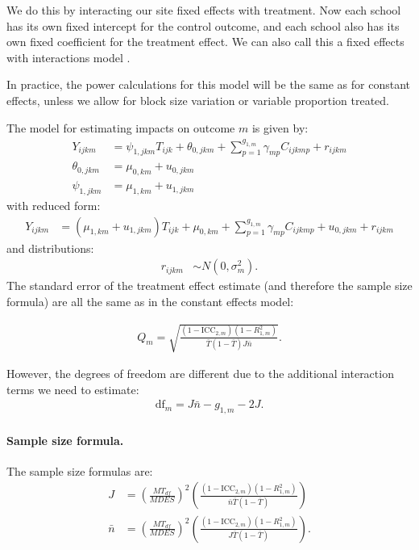 \documentclass[12pt]{article}
\begin{document}
We do this by interacting our site fixed effects with treatment.
Now each school has its own fixed intercept for the control outcome, and each school also has its own fixed coefficient for the treatment effect.
We can also call this a fixed effects with interactions model \citep{Miratrix2020}.

In practice, the power calculations for this model will be the same as for constant effects, unless we allow for block size variation or variable proportion treated.

The model for estimating impacts on outcome $m$ is given by:
\begin{align}
Y_{ijkm} &= \psi_{1,jkm} T_{ijk} + \theta_{0,jkm} + \sum_{p=1}^{g_{1,m}} \gamma_{mp} C_{ijkmp} + r_{ijkm}\\
\nonumber \theta_{0,jkm} &= \mu_{0,km} + u_{0,jkm}\\
\nonumber \psi_{1,jkm} &= \mu_{1,km} + u_{1,jkm}
\end{align}
with reduced form:
\begin{align}
Y_{ijkm} &= \left(\mu_{1,km} + u_{1,jkm}\right) T_{ijk} + \mu_{0,km} + \sum_{p=1}^{g_{1,m}} \gamma_{mp} C_{ijkmp} + u_{0,jkm} + r_{ijkm}
\end{align}
and distributions:
\begin{align}
r_{ijkm} &\sim N\left(0, \sigma^2_m\right).
\end{align}
The standard error of the treatment effect estimate (and therefore the sample size formula) are all the same as in the constant effects model:

\begin{align} Q_m = \sqrt{\frac{(1-\text{ICC}_{2,m})(1-R^2_{1,m})}{\bar{T}(1 - \bar{T}) J \bar{n}}} . \end{align}

However, the degrees of freedom are different due to the additional interaction terms we need to estimate:
\begin{align}\text{df}_m = J \bar{n} - g_{1,m} - 2J.\end{align}

\paragraph{Sample size formula.} 
The sample size formulas are:
\begin{align}
J &= \left(\frac{MT_{df}}{MDES}\right)^2 \left(\frac{(1-\text{ICC}_{2,m})(1-R^2_{1,m})}{\bar{n} \bar{T} (1 - \bar{T})} \right)\\
\bar{n} &= \left(\frac{MT_{df}}{MDES}\right)^2 \left(\frac{(1-\text{ICC}_{2,m})(1-R^2_{1,m})}{J \bar{T} (1 - \bar{T})} \right) .
\end{align}
\end{document}
